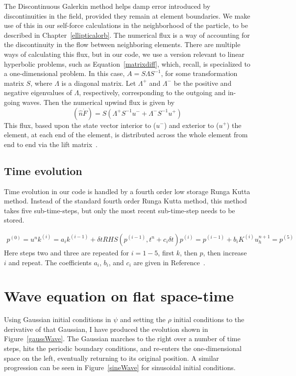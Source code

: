 The Discontinuous Galerkin method helps damp error introduced by discontinuities in the field, provided they remain at element boundaries. We make use of this in our self-force calculations in the neighborhood of the particle, to be described in Chapter~\ref{ellipticalorb}. The numerical flux is a way of accounting for the discontinuity in the flow between neighboring elements. There are multiple ways of calculating this flux, but in our code, we use a version relevant to linear hyperbolic problems, such as Equation~\ref{matrixdiff}, which, recall, is specialized to a one-dimensional problem. In this case, $A=S\Lambda S^{-1}$, for some transformation matrix $S$, where $\Lambda$ is a diagonal matrix. Let $\Lambda^+$ and $\Lambda^-$ be the positive and negative eigenvalues of $\Lambda$, respectively, corresponding to the outgoing and in-going waves. Then the numerical upwind flux is given by
\begin{equation}
  (\hat{n}\dot F)=S(\Lambda^+ S^{-1} u^- + \Lambda^- S^{-1} u^+)
\end{equation}
This flux, based upon the state vector interior to ($u^-$) and exterior to ($u^+$) the element, at each end of the element, is distributed across the whole element from end to end via the lift matrix~\cite{dghesthaven}.


\subsection{Time evolution}

Time evolution in our code is handled by a fourth order low storage Runga Kutta method. Instead of the standard fourth order Runga Kutta method, this method takes five sub-time-steps, but only the most recent sub-time-step needs to be stored.

\begin{eqnarray}
  p^{(0)}=u^n
  k^{(i)}=a_ik^{(i-1)}+\delta t RHS(p^{(i-1)},t^n+c_i\delta t)
  p^{(i)}=p^{(i-1)}+b_iK^{(i)}
  u_h^{n+1}=p^{(5)}
\end{eqnarray}
Here steps two and three are repeated for $i=1-5$, first $k$, then $p$, then increase $i$ and repeat. The coefficients $a_i$, $b_i$, and $c_i$ are given in Reference~\cite{dghesthaven}.

\section{Wave equation on flat space-time}

Using Gaussian initial conditions in $\psi$ and setting the $\rho$ initial conditions to the derivative of that Gaussian, I have produced the evolution shown in Figure~\ref{gaussWave}. The Gaussian marches to the right over a number of time steps, hits the periodic boundary conditions, and re-enters the one-dimensional space on the left, eventually returning to its original position. A similar progression can be seen in Figure~\ref{sineWave} for sinusoidal initial conditions.

